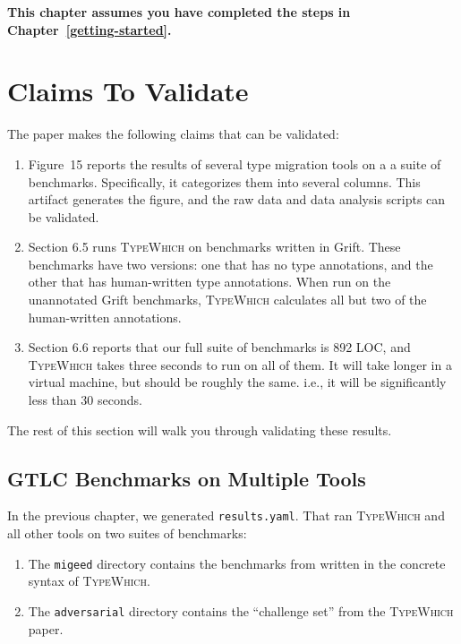 \documentclass{book}
\newcommand{\system}{\textsc{TypeWhich}\xspace}
\begin{document}
\noindent
\textbf{This chapter assumes you have completed the steps in Chapter~\ref{getting-started}.}

\section{Claims To Validate}

The paper makes the following claims that can be validated:
\begin{enumerate}

    \item Figure~15 reports the results of several type migration tools on a
    a suite of benchmarks. Specifically, it categorizes them into several 
    columns. This artifact generates the figure, and the raw data and data
    analysis scripts can be validated.

    \item Section 6.5 runs \system on benchmarks written in Grift. These
    benchmarks have two versions: one that has no type annotations, and the other
    that has human-written type annotations. When run on the unannotated Grift
    benchmarks, \system calculates all but two of the human-written annotations.

    \item Section 6.6 reports that our full suite of benchmarks is 892 LOC, and
    \system{} takes three seconds to run on all of them. It will take longer in
    a virtual machine, but should be roughly the same. i.e., it will be significantly
    less than 30 seconds.

\end{enumerate}

The rest of this section will walk you through validating these results.

\subsection{GTLC Benchmarks on Multiple Tools}

In the previous chapter, we generated \texttt{results.yaml}. That
ran \system{} and all other tools on two suites of benchmarks:
\begin{enumerate}
        
\item The \texttt{migeed} directory contains the benchmarks
from \citet{migeed:decidable} written in the concrete syntax of \system.
     
\item The \texttt{adversarial} directory contains the ``challenge set'' from
the \system paper.
\end{enumerate}
\end{document}
